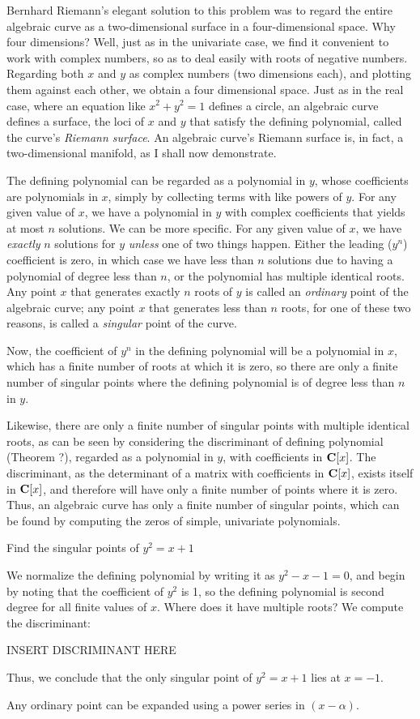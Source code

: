 Bernhard Riemann's elegant solution to this problem was to regard the
entire algebraic curve as a two-dimensional surface in a
four-dimensional space.  Why four dimensions?  Well, just as in the
univariate case, we find it convenient to work with complex numbers,
so as to deal easily with roots of negative numbers.  Regarding both
$x$ and $y$ as complex numbers (two dimensions each), and plotting
them against each other, we obtain a four dimensional space.  Just as
in the real case, where an equation like $x^2 + y^2 = 1$ defines a
circle, an algebraic curve defines a surface, the loci of $x$ and $y$
that satisfy the defining polynomial, called the curve's {\it Riemann
surface}.  An algebraic curve's Riemann surface is, in fact, a
two-dimensional manifold, as I shall now demonstrate.

The defining polynomial can be regarded as a polynomial in $y$, whose
coefficients are polynomials in $x$, simply by collecting terms with
like powers of $y$.  For any given value of $x$, we have a polynomial
in $y$ with complex coefficients that yields at most $n$ solutions.
We can be more specific.  For any given value of $x$, we have {\it
exactly} $n$ solutions for $y$ {\it unless} one of two things happen.
Either the leading ($y^n$) coefficient is zero, in which case we have
less than $n$ solutions due to having a polynomial of degree less than
$n$, or the polynomial has multiple identical roots.  Any point $x$
that generates exactly $n$ roots of $y$ is called an {\it ordinary}
point of the algebraic curve; any point $x$ that generates less than
$n$ roots, for one of these two reasons, is called a {\it singular}
point of the curve.

Now, the coefficient of $y^n$ in the defining polynomial will be a
polynomial in $x$, which has a finite number of roots at which it is
zero, so there are only a finite number of singular points where the
defining polynomial is of degree less than $n$ in $y$.

Likewise, there are only a finite number of singular points with
multiple identical roots, as can be seen by considering the
discriminant of defining polynomial (Theorem ?), regarded as a
polynomial in $y$, with coefficients in ${\bf C}[x]$.  The
discriminant, as the determinant of a matrix with coefficients in
${\bf C}[x]$, exists itself in ${\bf C}[x]$, and therefore will have
only a finite number of points where it is zero.  Thus, an algebraic
curve has only a finite number of singular points, which can be found
by computing the zeros of simple, univariate polynomials.

\example Find the singular points of $y^2 = x + 1$

We normalize the defining polynomial by writing it as $y^2 - x - 1 =
0$, and begin by noting that the coefficient of $y^2$ is 1, so the
defining polynomial is second degree for all finite values of $x$.
Where does it have multiple roots?  We compute the discriminant:

INSERT DISCRIMINANT HERE

Thus, we conclude that the only singular point of $y^2 = x + 1$ lies at
$x = -1$.

\endexample

Any ordinary point can be expanded using a power series in $(x-\alpha)$.
